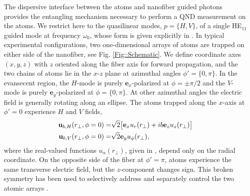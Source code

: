 \documentclass[preprint, aps,pra,onecolumn]{revtex4-1} %
\begin{document}
The dispersive interface between the atoms and nanofiber guided photons provides the entangling mechanism necessary to perform a QND measurement on the atoms.  
We restrict here to the quasilinear modes, $p =\{H,V\}$, of a single HE$_{11}$ guided mode at frequency $\omega_0$, whose form is given explicitly in .  
In typical experimental configurations, two one-dimensional arrays of atoms are trapped on either side of the nanofiber, see Fig. \ref{Fig::Schematic}. 
We define coordinate axes $(x,y,z)$ with $z$ oriented along the fiber axis for forward propagation, and the two chains of atoms lie in the $x$-$z$ plane {\color{blue} at azimuthal angles} $\phi' = \{0, \pi\}$.
In the evansecent region, the $H$-mode is purely $\mathbf{e}_x$-polarized at $\phi = \pm \pi/2$ and the $V$-mode is purely $\mathbf{e}_y$-polarized at $\phi = \{0,\pi\}$.  
At other azimuthal angles the electric field is generally rotating along an ellipse.  The atoms trapped along the $x$-axis at $\phi'=0$ experience $H$ and $V$ fields,
	\begin{align}
		\mathbf{u}_{b,H}(r_\perp, \phi = 0) = & \sqrt{2} \big[ \mathbf{e}_x u_r(r_\perp)+  i b \mathbf{e}_z  u_z(r_\perp) \big] \\
		\mathbf{u}_{b,V}(r_\perp, \phi = 0) = & \sqrt{2} \mathbf{e}_y u_\phi(r_\perp), 
	\end{align}
where the real-valued functions $u_\alpha(r_\perp)$, given in , depend only on the radial coordinate.  
On the opposite side of the fiber at $\phi' = \pi$, atoms experience the same transverse electric field, but the $z$-component changes sign.   This broken symmetry has been used to selectively address and separately control the two atomic arrays \cite{mitsch_exploiting_2014, mitsch_quantum_2014, sayrin_storage_2015}.  
\end{document}
